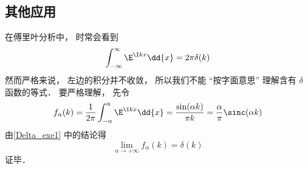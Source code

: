 \subsection{其他应用}
\begin{example}{}
在傅里叶分析中， 时常会看到
\begin{equation}
\int_{-\infty}^\infty \E^{\I kx}\dd{x} = 2\pi \delta(k)
\end{equation}
然而严格来说， 左边的积分并不收敛， 所以我们不能 “按字面意思” 理解含有 $\delta$ 函数的等式． 要严格理解， 先令
\begin{equation}
f_\alpha(k) = \frac{1}{2\pi}\int_{-\alpha}^{\alpha} \E^{\I kx}\dd{x} = \frac{\sin(\alpha k)}{\pi k} = \frac{\alpha}{\pi} \sinc(\alpha k)
\end{equation}
由\autoref{Delta_exe1} 中的结论得
\begin{equation}
\lim_{\alpha\to+\infty} f_\alpha(k) = \delta(k)
\end{equation}
证毕．
\end{example}
